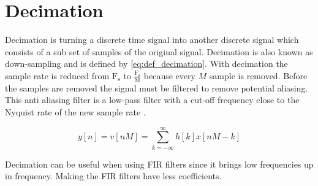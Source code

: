 
\section{Decimation}
Decimation is turning a discrete time signal into another discrete signal which consists of a sub set of samples of the original signal. Decimation is also known as down-sampling and is defined by \autoref{eq:def_decimation}. With decimation the sample rate is reduced from ${\mathrm{F}}_{\mathrm{s}}$ to $\frac{\mathrm{F}_{\mathrm{s}}}{\mathrm{M}}$ because every $M$ sample is removed. Before the samples are removed the signal must be filtered to remove potential aliasing. This anti aliasing filter is a low-pass filter with a cut-off frequency close to the Nyquist rate of the new sample rate \citep{multirate_dsp}.

\begin{equation}\label{eq:def_decimation}
	y[n] = v[nM] =  \sum_{k=- \infty}^\infty h[k]x[nM-k]
\end{equation}

Decimation can be useful when using FIR filters since it brings low frequencies up in frequency. Making the FIR filters have less coefficients.